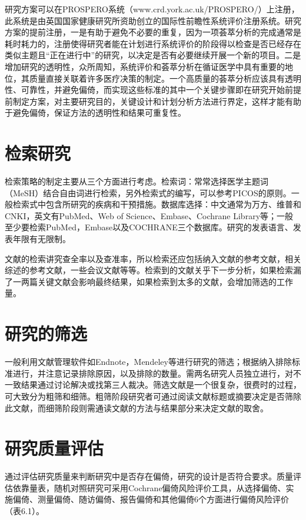 \documentclass[
  chinese-hans,
  letterpaper,
  DIV=11,
  numbers=noendperiod]{scrreprt}
\begin{document}
研究方案可以在PROSPERO系统（www.crd.york.ac.uk/PROSPERO/）上注册，此系统是由英国国家健康研究所资助创立的国际性前瞻性系统评价注册系统。研究方案的提前注册，一是有助于避免不必要的重复，因为一项荟萃分析的完成通常是耗时耗力的，注册使得研究者能在计划进行系统评价的阶段得以检查是否已经存在类似主题且``正在进行中''的研究，以决定是否有必要继续开展一个新的项目。二是增加研究的透明性，众所周知，系统评价和荟萃分析在循证医学中具有重要的地位，其质量直接关联着许多医疗决策的制定。一个高质量的荟萃分析应该具有透明性、可靠性，并避免偏倚，而实现这些标准的其中一个关键步骤即在研究开始前提前制定方案，对主要研究目的，关键设计和计划分析方法进行界定，这样才能有助于避免偏倚，保证方法的透明性和结果可重复性。

\section{检索研究}\label{ux68c0ux7d22ux7814ux7a76}

检索策略的制定主要从三个方面进行考虑。检索词：常常选择医学主题词（MeSH）结合自由词进行检索，另外检索式的编写，可以参考PICOS的原则。一般检索式中包含所研究的疾病和干预措施。数据库选择：中文通常为万方、维普和CNKI，英文有PubMed、Web
of Science、Embase、Cochrane
Library等；一般至少要检索PubMed，Embase以及COCHRANE三个数据库。研究的发表语言、发表年限有无限制。

文献的检索讲究查全率以及查准率，所以检索还应包括纳入文献的参考文献，相关综述的参考文献，一些会议文献等等。检索到的文献关乎下一步分析，如果检索漏了一两篇关键文献会影响最终结果，如果检索到太多的文献，会增加筛选的工作量。

\section{研究的筛选}\label{ux7814ux7a76ux7684ux7b5bux9009}

一般利用文献管理软件如Endnote，Mendeley等进行研究的筛选；根据纳入排除标准进行，并注意记录排除原因，以及排除的数量。需两名研究人员独立进行，对不一致结果通过讨论解决或找第三人裁决。筛选文献是一个很复杂，很费时的过程，可大致分为粗筛和细筛。粗筛阶段研究者可通过阅读文献标题或摘要决定是否筛除此文献，而细筛阶段则需通读文献的方法与结果部分来决定文献的取舍。

\section{研究质量评估}\label{ux7814ux7a76ux8d28ux91cfux8bc4ux4f30}

通过评估研究质量来判断研究中是否存在偏倚，研究的设计是否符合要求。质量评估依靠量表，随机对照研究可采用Cochrane偏倚风险评价工具，从选择偏倚、实施偏倚、测量偏倚、随访偏倚、报告偏倚和其他偏倚6个方面进行偏倚风险评价（表6.1）。
\end{document}
